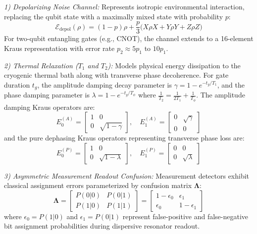 \documentclass[12pt,onecolumn,draftclsnofoot]{IEEEtran}
\begin{document}
\textit{1) Depolarizing Noise Channel:} Represents isotropic environmental interaction, replacing the qubit state with a maximally mixed state with probability $p$:
\begin{equation}
\mathcal{E}_{\text{depol}}(\rho) = (1 - p)\rho + \frac{p}{3}\Big(X\rho X + Y\rho Y + Z\rho Z\Big)
\end{equation}
For two-qubit entangling gates (e.g., CNOT), the channel extends to a 16-element Kraus representation with error rate $p_2 \approx 5p_1$ to $10p_1$.

\textit{2) Thermal Relaxation ($T_1$ and $T_2$):} Models physical energy dissipation to the cryogenic thermal bath along with transverse phase decoherence. For gate duration $t_g$, the amplitude damping decay parameter is $\gamma = 1 - e^{-t_g / T_1}$, and the phase damping parameter is $\lambda = 1 - e^{-t_g / T_{\phi}}$ where $\frac{1}{T_2} = \frac{1}{2T_1} + \frac{1}{T_{\phi}}$. The amplitude damping Kraus operators are:
\begin{equation}
E_0^{(A)} = \begin{bmatrix} 1 & 0 \\ 0 & \sqrt{1 - \gamma} \end{bmatrix}, \quad E_1^{(A)} = \begin{bmatrix} 0 & \sqrt{\gamma} \\ 0 & 0 \end{bmatrix}
\end{equation}
and the pure dephasing Kraus operators representing transverse phase loss are:
\begin{equation}
E_0^{(P)} = \begin{bmatrix} 1 & 0 \\ 0 & \sqrt{1 - \lambda} \end{bmatrix}, \quad E_1^{(P)} = \begin{bmatrix} 0 & 0 \\ 0 & \sqrt{\lambda} \end{bmatrix}
\end{equation}

\textit{3) Asymmetric Measurement Readout Confusion:} Measurement detectors exhibit classical assignment errors parameterized by confusion matrix $\mathbf{\Lambda}$:
\begin{equation}
\mathbf{\Lambda} = \begin{bmatrix} P(0|0) & P(0|1) \\ P(1|0) & P(1|1) \end{bmatrix} = \begin{bmatrix} 1 - \epsilon_0 & \epsilon_1 \\ \epsilon_0 & 1 - \epsilon_1 \end{bmatrix}
\end{equation}
where $\epsilon_0 = P(1|0)$ and $\epsilon_1 = P(0|1)$ represent false-positive and false-negative bit assignment probabilities during dispersive resonator readout.
\end{document}
